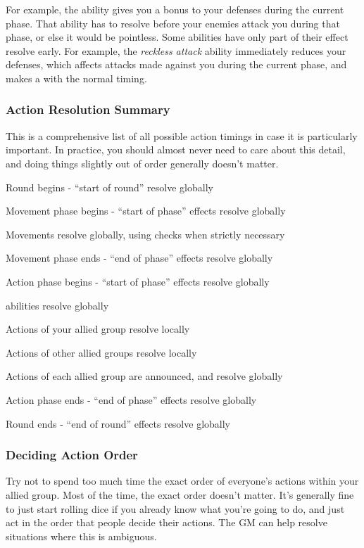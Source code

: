      For example, the  ability gives you a bonus to your defenses during the current phase.
      That ability has to resolve before your enemies attack you during that phase, or else it would be pointless.
      Some abilities have only part of their effect resolve early.
      For example, the \textit{reckless attack} ability immediately reduces your defenses, which affects attacks made against you during the current phase, and makes a  with the normal timing.

    \subsubsection{Action Resolution Summary}
      This is a comprehensive list of all possible action timings in case it is particularly important.
      In practice, you should almost never need to care about this detail, and doing things slightly out of order generally doesn't matter.

      \begin{enumerate*}
        \item Round begins - ``start of round'' resolve globally
        \item Movement phase begins - ``start of phase'' effects resolve globally
        \item Movements resolve globally, using  checks when strictly necessary
        \item Movement phase ends - ``end of phase'' effects resolve globally
        \item Action phase begins - ``start of phase'' effects resolve globally
        \item {} abilities resolve globally
        \item Actions of your allied group resolve locally
        \item Actions of other allied groups resolve locally
        \item Actions of each allied group are announced, and resolve globally
        \item Action phase ends - ``end of phase'' effects resolve globally
        \item Round ends - ``end of round'' effects resolve globally
      \end{enumerate*}

    \subsubsection{Deciding Action Order}\label{Deciding Action Order}
      Try not to spend too much time the exact order of everyone's actions within your allied group.
      Most of the time, the exact order doesn't matter.
      It's generally fine to just start rolling dice if you already know what you're going to do, and just act in the order that people decide their actions.
      The GM can help resolve situations where this is ambiguous.

